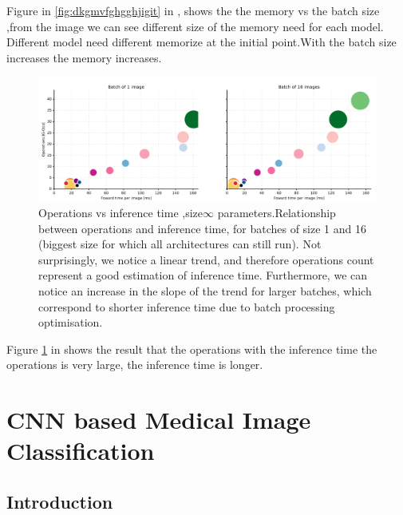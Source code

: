 \documentclass[10pt,twocolumn,letterpaper]{article}
\begin{document}
Figure in \ref{fig:dkgmvfghgghjigit} in \cite{canziani2016an}, shows the the memory vs the batch size ,from the image we can see different size of the memory need for each model. Different model need different memorize at the initial point.With the batch size increases the memory increases. 



\begin{figure}[htbp]
	\centering
	\includegraphics[width=0.8\linewidth]{Pic/20.png}
	
	\caption{Operations	vs inference time ,size$\infty$	parameters.Relationship between operations and inference
		time, for batches of size 1 and 16 (biggest size for which all architectures can still run).  Not surprisingly, we
		notice a linear trend, and therefore operations count represent a good estimation of inference time. Furthermore,
		we can notice an increase in the slope of the trend for larger batches, which correspond to shorter inference
		time due to batch processing optimisation.}
	
	\label{fig:dkgmvfghghgghjigit}
	
\end{figure}



Figure \ref{fig:dkgmvfghghgghjigit} in \cite{canziani2016an} shows the result that the operations with the inference time the operations is very large, the inference time is longer.








\section{CNN based Medical Image Classification}

\subsection{Introduction}
\end{document}
